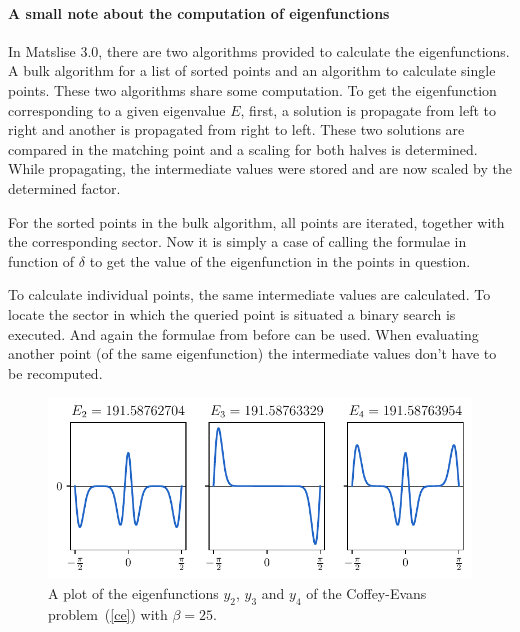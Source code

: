 \paragraph{A small note about the computation of eigenfunctions}

In Matslise 3.0, there are two algorithms provided to calculate the eigenfunctions. A bulk algorithm for a list of sorted points and an algorithm to calculate single points. These two algorithms share some computation. To get the eigenfunction corresponding to a given eigenvalue $E$, first, a solution is propagate from left to right and another is propagated from right to left. These two solutions are compared in the matching point and a scaling for both halves is determined. While propagating, the intermediate values were stored and are now scaled by the determined factor.

For the sorted points in the bulk algorithm, all points are iterated, together with the corresponding sector. Now it is simply a case of calling the formulae in function of $\delta$ to get the value of the eigenfunction in the points in question.

To calculate individual points, the same intermediate values are calculated. To locate the sector in which the queried point is situated a binary search is executed. And again the formulae from before can be used. When evaluating another point (of the same eigenfunction) the intermediate values don't have to be recomputed.

\begin{figure}
    \begin{center}
        \includegraphics[width=1\textwidth]{img/chapter2/pyslise_test/coffey_evans_eigenfunctions.pdf}
    \end{center}
    \caption{\label{ce_fig}A plot of the eigenfunctions $y_2$, $y_3$ and $y_4$ of the Coffey-Evans problem~(\ref{ce}) with $\beta=25$.}
\end{figure}

